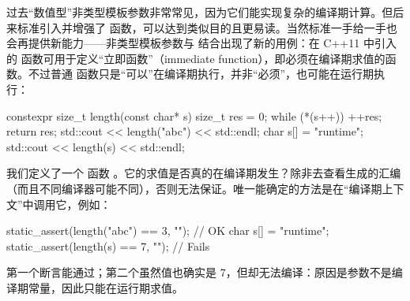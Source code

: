 过去“数值型”非类型模板参数非常常见，因为它们能实现复杂的编译期计算。但后来标准引入并增强了  函数，可以达到类似目的且更易读。当然标准一手给一手也会再提供新能力——非类型模板参数与  结合出现了新的用例：在 C++11 中引入的  函数可用于定义“立即函数”（immediate function），即必须在编译期求值的函数。不过普通  函数只是“可以”在编译期执行，并非“必须”，也可能在运行期执行：

\begin{code}
constexpr size_t length(const char* s) {
  size_t res = 0;
  while (*(s++)) ++res;
  return res;
}
std::cout << length("abc") << std::endl;
char s[] = "runtime";
std::cout << length(s) << std::endl;
\end{code}

我们定义了一个  函数 。它的求值是否真的在编译期发生？除非去查看生成的汇编（而且不同编译器可能不同），否则无法保证。唯一能确定的方法是在“编译期上下文”中调用它，例如：

\begin{code}
static_assert(length("abc") == 3, ""); // OK
char s[] = "runtime";
static_assert(length(s) == 7, ""); // Fails
\end{code}

第一个断言能通过；第二个虽然值也确实是 7，但却无法编译：原因是参数不是编译期常量，因此只能在运行期求值。

